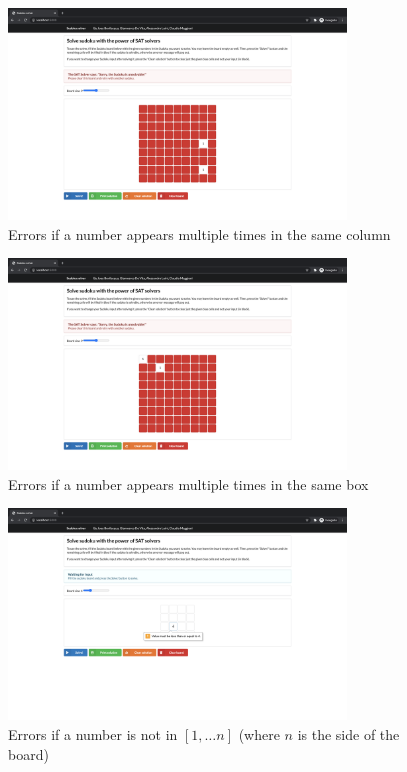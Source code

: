 \documentclass[]{usiinfprospectus}
\newcounter{col}
\begin{document}
\begin{figure}[ht]
\centering
\includegraphics[width=0.8\textwidth]{pics/column_check.png}
\caption{Errors if a number appears multiple times in the same column}
\end{figure}

\begin{figure}[ht]
\centering
\includegraphics[width=0.8\textwidth]{pics/box_check.png}
\caption{Errors if a number appears multiple times in the same box}
\end{figure}

\begin{figure}[ht]
\centering
\includegraphics[width=0.8\textwidth]{pics/input_check.png}
\caption{Errors if a number is not in $ \left[ 1, \hdots n \right] $ (where $n$ is the side of the board)}
\end{figure}
\end{document}
